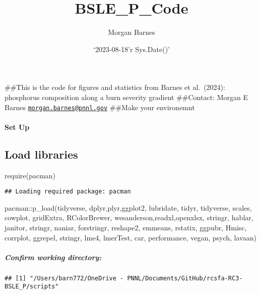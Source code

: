 \documentclass[
]{article}
\title{BSLE\_P\_Code}
\author{Morgan Barnes}
\date{`2023-08-18'r Sys.Date()'}
\newenvironment{Shaded}{\begin{snugshade}}{\end{snugshade}}
\newcommand{\FunctionTok}[1]{\textcolor[rgb]{0.00,0.00,0.00}{#1}}
\newcommand{\NormalTok}[1]{#1}
\newcommand{\SpecialCharTok}[1]{\textcolor[rgb]{0.00,0.00,0.00}{#1}}
\begin{document}
\maketitle

\#\#This is the code for figures and statistics from Barnes et
al.~(2024): phosphorus composition along a burn severity gradient
\#\#Contact: Morgan E Barnes
\href{mailto:morgan.barnes@pnnl.gov}{\nolinkurl{morgan.barnes@pnnl.gov}}
\#\#Make your environemnt

\hypertarget{set-up}{%
\paragraph{Set Up}\label{set-up}}

\hypertarget{load-libraries}{%
\subsection{Load libraries}\label{load-libraries}}

\begin{Shaded}
\begin{Highlighting}[]
\FunctionTok{require}\NormalTok{(pacman)}
\end{Highlighting}
\end{Shaded}

\begin{verbatim}
## Loading required package: pacman
\end{verbatim}

\begin{Shaded}
\begin{Highlighting}[]
\NormalTok{pacman}\SpecialCharTok{::}\FunctionTok{p\_load}\NormalTok{(tidyverse,}
\NormalTok{              dplyr,plyr,ggplot2,}
\NormalTok{              lubridate, tidyr, tidyverse,}
\NormalTok{              scales, cowplot, gridExtra, RColorBrewer,}
\NormalTok{              wesanderson,readxl,openxlsx, stringr, hablar,}
\NormalTok{              janitor, stringr, naniar, forstringr, reshape2, }
\NormalTok{              emmeans, rstatix, ggpubr, Hmisc, corrplot, ggrepel, }
\NormalTok{              stringr, lme4, lmerTest, car, performance, vegan, psych, lavaan)}
\end{Highlighting}
\end{Shaded}

\hypertarget{confirm-working-directory}{%
\subparagraph{Confirm working
directory:}\label{confirm-working-directory}}

\begin{verbatim}
## [1] "/Users/barn772/OneDrive - PNNL/Documents/GitHub/rcsfa-RC3-BSLE_P/scripts"
\end{verbatim}
\end{document}
